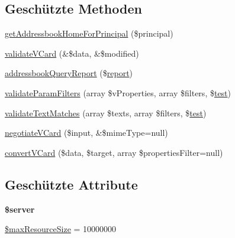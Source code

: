 \subsection*{Geschützte Methoden}
\begin{DoxyCompactItemize}
\item 
\mbox{\hyperlink{class_sabre_1_1_card_d_a_v_1_1_plugin_a37ea9c1f3810dd366e726518b0b1f609}{get\+Addressbook\+Home\+For\+Principal}} (\$principal)
\item 
\mbox{\hyperlink{class_sabre_1_1_card_d_a_v_1_1_plugin_a7864bb3efa5364696aae31f94386b549}{validate\+V\+Card}} (\&\$data, \&\$modified)
\item 
\mbox{\hyperlink{class_sabre_1_1_card_d_a_v_1_1_plugin_a66ef72399eeef5a304dac24fd453b19a}{addressbook\+Query\+Report}} (\$\mbox{\hyperlink{class_sabre_1_1_card_d_a_v_1_1_plugin_a9f09093f18cfdf7f7d19d240f10f340e}{report}})
\item 
\mbox{\hyperlink{class_sabre_1_1_card_d_a_v_1_1_plugin_a0c14ca0bed193a41c326106573f3127f}{validate\+Param\+Filters}} (array \$v\+Properties, array \$filters, \$\mbox{\hyperlink{classtest}{test}})
\item 
\mbox{\hyperlink{class_sabre_1_1_card_d_a_v_1_1_plugin_aeb4745962949af1eb40beff7e4a46844}{validate\+Text\+Matches}} (array \$texts, array \$filters, \$\mbox{\hyperlink{classtest}{test}})
\item 
\mbox{\hyperlink{class_sabre_1_1_card_d_a_v_1_1_plugin_a4fd65360d89249c833205fc3978f408e}{negotiate\+V\+Card}} (\$input, \&\$mime\+Type=null)
\item 
\mbox{\hyperlink{class_sabre_1_1_card_d_a_v_1_1_plugin_a4e067b1940b1b73b6808c7531ff82d3c}{convert\+V\+Card}} (\$data, \$target, array \$properties\+Filter=null)
\end{DoxyCompactItemize}
\subsection*{Geschützte Attribute}
\begin{DoxyCompactItemize}
\item 
\mbox{\label{class_sabre_1_1_card_d_a_v_1_1_plugin_afcd43ca60d616f6038aa4eecffd0ef62}} 
{\bfseries \$server}
\item 
\mbox{\hyperlink{class_sabre_1_1_card_d_a_v_1_1_plugin_abd7335e05b9187da1dc5db276604cd2b}{\$max\+Resource\+Size}} = 10000000
\end{DoxyCompactItemize}


